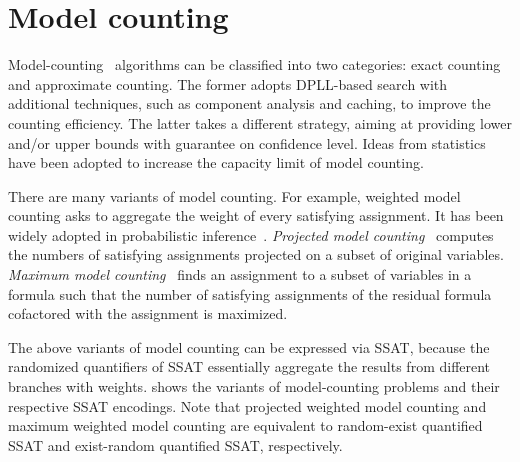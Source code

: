 \section{Model counting}
\label{sect:related-work-model-counting}

Model-counting~\cite{SATHandbook-ModelCounting} algorithms can be classified into two categories:
exact counting and approximate counting.
The former adopts DPLL-based search with additional techniques,
such as component analysis and caching, to improve the counting efficiency\cite{Sang2004,Sang2005ModelCounting}.
The latter takes a different strategy,
aiming at providing lower and/or upper bounds with guarantee on confidence level.
Ideas from statistics~\cite{Chakraborty2016} have been adopted to increase the capacity limit of model counting.

There are many variants of model counting.
For example,
weighted model counting asks to aggregate the weight of every satisfying assignment.
It has been widely adopted in probabilistic inference~\cite{Sang2005BayesianInference,Chavira2008}.
\textit{Projected model counting}~\cite{Aziz2015} computes the numbers of satisfying assignments
projected on a subset of original variables.
\textit{Maximum model counting}~\cite{Fremont2017} finds an assignment to a subset of variables in a formula
such that the number of satisfying assignments of the residual formula cofactored with the assignment is maximized.

The above variants of model counting can be expressed via SSAT,
because the randomized quantifiers of SSAT essentially aggregate the results from different branches with weights.
 shows the variants of model-counting problems and their respective SSAT encodings.
Note that projected weighted model counting and maximum weighted model counting are equivalent to
random-exist quantified SSAT and exist-random quantified SSAT, respectively.

